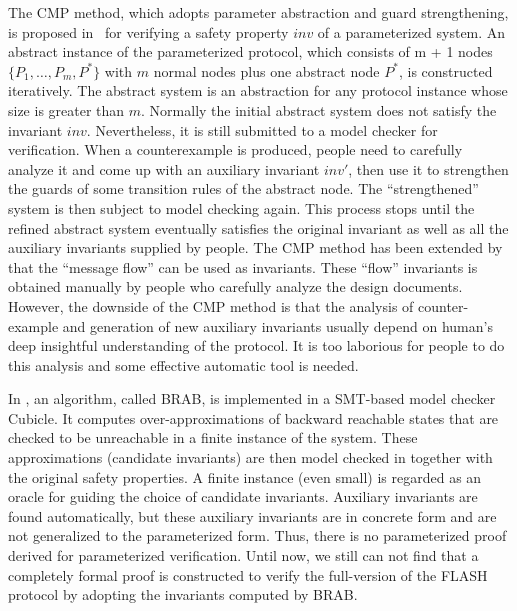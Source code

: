 \documentclass{llncs-new}
\newcommand{\bedt}[1]{{\color{black}#1}}
\begin{document}
The CMP method, which adopts parameter abstraction and guard strengthening, is proposed
in~\cite{Chou2004} for verifying a safety property $inv$ of
a parameterized system.
 An abstract instance of the parameterized protocol,  which consists of m + 1
nodes $\{P_1, \ldots , P_m, P^*\}$ with $m$ normal nodes plus one
abstract node $P^*$, is constructed iteratively. The abstract system is an
abstraction for any protocol instance whose size is greater than
$m$. Normally the initial abstract system does not satisfy the
invariant $inv$. Nevertheless, it is still submitted to a model
checker for verification. When a counterexample is produced, people need to
carefully analyze it and come up with an auxiliary invariant
$inv'$, then use it to strengthen the guards of some transition
rules of the abstract node. The ``strengthened'' system is then
subject to model checking again. This process stops until the
refined abstract system  eventually satisfies the original invariant
  as well as all the auxiliary invariants supplied by people. %
\bedt{The CMP method has been extended by \cite{Talupur2008a} that the ``message flow'' can be used as invariants. These ``flow'' invariants is obtained manually by people who carefully analyze the design documents.
 However, the downside of the CMP method is that the analysis of counter-example and generation of new auxiliary invariants usually
 depend on human's deep insightful understanding of the protocol.} It is too laborious for people to do this analysis and some effective automatic  tool is needed.%

\bedt{In \cite{cubeicBeyond}, an algorithm, called BRAB, is implemented in a SMT-based model checker Cubicle.  It} computes over-approximations of
backward reachable states that are checked to be unreachable in
a finite instance of the system. These approximations (candidate
invariants) are then model checked in together with the original
safety properties. A finite instance (even small) is regarded as
an oracle for guiding the choice of candidate
invariants. Auxiliary invariants are found automatically, but these auxiliary invariants are in concrete form and are not generalized to the parameterized form. Thus, there is no  parameterized proof derived for parameterized verification. Until now, we still can not find that a completely formal proof is constructed to verify the full-version of the FLASH protocol by adopting the invariants computed by BRAB.
\end{document}
